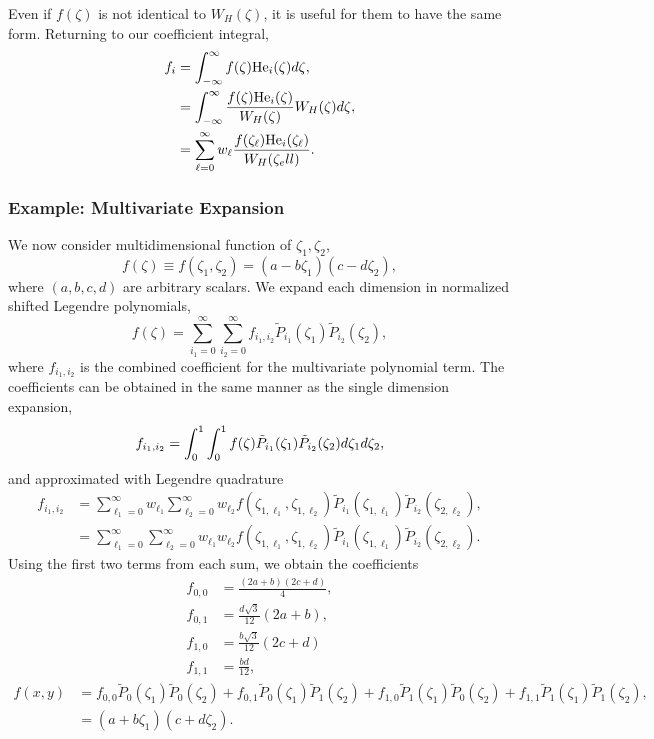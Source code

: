 Even if $f(\zeta)$ is not identical to $W_H(\zeta)$, it is useful for them to have the same form.  Returning to our coefficient integral,
\begin{align}
f_i&=\int_{-\infty}^\infty f(\zeta)\mbox{He}_i(\zeta) d\zeta,\\
  &=\int_{-\infty}^\infty \frac{f(\zeta)\mbox{He}_i(\zeta)}{W_H(\zeta)}W_H(\zeta)d\zeta,\\
  &=\sum_{\ell=0}^\infty w_\ell\frac{f(\zeta_\ell)\mbox{He}_i(\zeta_\ell)}{W_H(\zeta_ell)}.
\end{align}

\subsubsection{Example: Multivariate Expansion}
We now consider multidimensional function of $\zeta_1,\zeta_2$,
\begin{equation}
f(\zeta)\equiv f(\zeta_1,\zeta_2)=(a-b\zeta_1)(c-d\zeta_2),
\end{equation}
where $(a,b,c,d)$ are arbitrary scalars.  We expand each dimension in normalized shifted Legendre polynomials,
\begin{equation}
f(\zeta)=\sum_{i_1=0}^\infty \sum_{i_2=0}^\infty f_{i_1,i_2}\tilde P_{i_1}(\zeta_1)\tilde P_{i_2}(\zeta_2),
\end{equation}
where $f_{i_1,i_2}$ is the combined coefficient for the multivariate polynomial term.  The coefficients can be obtained in the same manner as the single dimension expansion,
\begin{equation}
f_{i_1,i_2}=\int_0^1\int_0^1 f(\zeta)\tilde P_{i_1}(\zeta_1)\tilde P_{i_2}(\zeta_2)d\zeta_1d\zeta_2,
\end{equation}
and approximated with Legendre quadrature
\begin{align}
f_{i_1,i_2}&=\sum_{\ell_1=0}^\infty w_{\ell_1} \sum_{\ell_2=0}^\infty w_{\ell_2}
     f(\zeta_{1,\ell_1},\zeta_{1,\ell_2})\tilde P_{i_1}(\zeta_{1,\ell_1})\tilde P_{i_2}(\zeta_{2,\ell_2}),\\
  &=\sum_{\ell_1=0}^\infty \sum_{\ell_2=0}^\infty w_{\ell_1}w_{\ell_2}
     f(\zeta_{1,\ell_1},\zeta_{1,\ell_2})\tilde P_{i_1}(\zeta_{1,\ell_1})\tilde P_{i_2}(\zeta_{2,\ell_2}).
\end{align}
Using the first two terms from each sum, we obtain the coefficients
\begin{align}
f_{0,0}&=\frac{(2a+b)(2c+d)}{4},\\
f_{0,1}&= \frac{d\sqrt{3}}{12}(2a+b), \\
f_{1,0}&=\frac{b\sqrt{3}}{12}(2c+d) \\
f_{1,1}&=\frac{bd}{12},
\end{align}
\begin{align}
f(x,y)&=f_{0,0}\tilde P_0(\zeta_1)\tilde P_0(\zeta_2) +
f_{0,1}\tilde P_0(\zeta_1)\tilde P_1(\zeta_2) +
f_{1,0}\tilde P_1(\zeta_1)\tilde P_0(\zeta_2) +
f_{1,1}\tilde P_1(\zeta_1)\tilde P_1(\zeta_2),\\
&=(a+b\zeta_1)(c+d\zeta_2).
\end{align}

